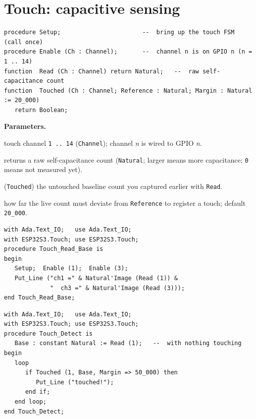\section{Touch: capacitive sensing}

\begin{lstlisting}
procedure Setup;                       --  bring up the touch FSM (call once)
procedure Enable (Ch : Channel);       --  channel n is on GPIO n (n = 1 .. 14)
function  Read (Ch : Channel) return Natural;   --  raw self-capacitance count
function  Touched (Ch : Channel; Reference : Natural; Margin : Natural := 20_000)
   return Boolean;
\end{lstlisting}

\textbf{Parameters.}
\begin{description}[style=nextline]
\item[\texttt{Ch}] touch channel \texttt{1\,..\,14} (\texttt{Channel}); channel
  \emph{n} is wired to GPIO \emph{n}.
\item[\texttt{Read}] returns a raw self-capacitance count (\texttt{Natural};
  larger means more capacitance; \texttt{0} means not measured yet).
\item[\texttt{Reference}] (\texttt{Touched}) the untouched baseline count you
  captured earlier with \texttt{Read}.
\item[\texttt{Margin}] how far the live count must deviate from \texttt{Reference}
  to register a touch; default \texttt{20\_000}.
\end{description}

\begin{lstlisting}
with Ada.Text_IO;   use Ada.Text_IO;
with ESP32S3.Touch; use ESP32S3.Touch;
procedure Touch_Read_Base is
begin
   Setup;  Enable (1);  Enable (3);
   Put_Line ("ch1 =" & Natural'Image (Read (1)) &
             "  ch3 =" & Natural'Image (Read (3)));
end Touch_Read_Base;
\end{lstlisting}

\begin{lstlisting}
with Ada.Text_IO;   use Ada.Text_IO;
with ESP32S3.Touch; use ESP32S3.Touch;
procedure Touch_Detect is
   Base : constant Natural := Read (1);   --  with nothing touching
begin
   loop
      if Touched (1, Base, Margin => 50_000) then
         Put_Line ("touched!");
      end if;
   end loop;
end Touch_Detect;
\end{lstlisting}

